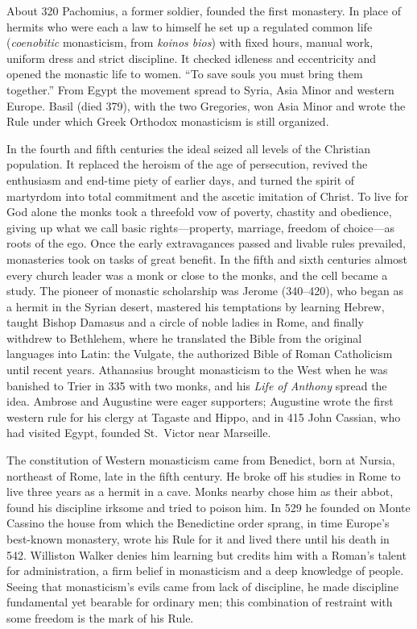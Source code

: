 About 320 Pachomius, a former soldier, founded the first monastery. In place of hermits who were each
a law to himself he set up a regulated common life (\emph{coenobitic} monasticism, from \emph{koinos
bios}) with fixed hours, manual work, uniform dress and strict discipline. It checked idleness and
eccentricity and opened the monastic life to women. ``To save souls you must bring them together.''
From Egypt the movement spread to Syria, Asia Minor and western Europe. Basil (died 379), with the two
Gregories, won Asia Minor and wrote the Rule under which Greek Orthodox monasticism is still
organized.

In the fourth and fifth centuries the ideal seized all levels of the Christian population. It
replaced the heroism of the age of persecution, revived the enthusiasm and end-time piety of earlier
days, and turned the spirit of martyrdom into total commitment and the ascetic imitation of Christ.
To live for God alone the monks took a threefold vow of poverty, chastity and obedience, giving up
what we call basic rights---property, marriage, freedom of choice---as roots of the ego. Once the
early extravagances passed and livable rules prevailed, monasteries took on tasks of great benefit.
In the fifth and sixth centuries almost every church leader was a monk or close to the monks, and the
cell became a study. The pioneer of monastic scholarship was Jerome (340--420), who began as a hermit
in the Syrian desert, mastered his temptations by learning Hebrew, taught Bishop Damasus and a circle
of noble ladies in Rome, and finally withdrew to Bethlehem, where he translated the Bible from the
original languages into Latin: the Vulgate, the authorized Bible of Roman Catholicism until recent
years. Athanasius brought monasticism to the West when he was banished to Trier in 335 with two monks,
and his \emph{Life of Anthony} spread the idea. Ambrose and Augustine were eager supporters; Augustine
wrote the first western rule for his clergy at Tagaste and Hippo, and in 415 John Cassian, who had
visited Egypt, founded St.~Victor near Marseille.

The constitution of Western monasticism came from Benedict, born at Nursia, northeast of Rome, late in
the fifth century. He broke off his studies in Rome to live three years as a hermit in a cave. Monks
nearby chose him as their abbot, found his discipline irksome and tried to poison him. In 529 he
founded on Monte Cassino the house from which the Benedictine order sprang, in time Europe's best-known monastery, wrote his Rule for it and lived there until his death in 542. Williston Walker denies him learning but credits him with a Roman's talent for administration, a firm belief in monasticism and a deep
knowledge of people. Seeing that monasticism's evils came from lack of discipline, he made discipline
fundamental yet bearable for ordinary men; this combination of restraint with some freedom is the
mark of his Rule.

